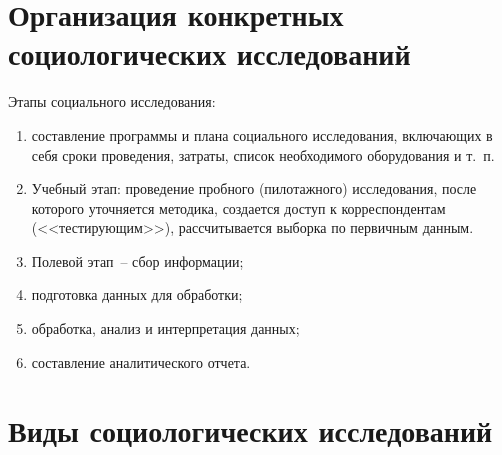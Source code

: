 \section{Организация конкретных социологических исследований}

  Этапы социального исследования:
  \begin{enumerate}
    \item составление программы и плана социального исследования, включающих в
      себя сроки проведения, затраты, список необходимого оборудования и т.~п.
    \item Учебный этап: проведение пробного (пилотажного) исследования, после
      которого уточняется методика, создается доступ к корреспондентам
      (<<тестирующим>>), рассчитывается выборка по первичным данным.
    \item Полевой этап~-- сбор информации;
    \item подготовка данных для обработки;
    \item обработка, анализ и интерпретация данных;
    \item составление аналитического отчета.
  \end{enumerate}

\section{Виды социологических исследований}

